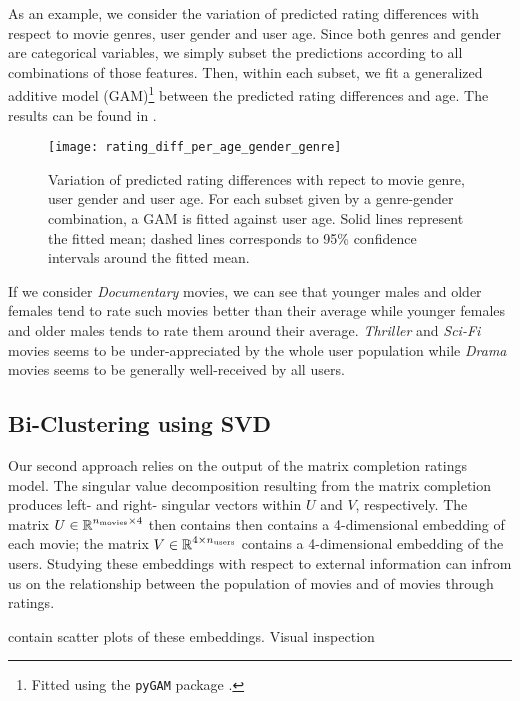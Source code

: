 \documentclass[bj, preprint]{imsart}
\begin{document}
As an example, we consider the variation of predicted rating differences with respect to movie genres, user gender and user age. Since both genres and gender are categorical variables, we simply subset the predictions according to all combinations of those features. Then, within each subset, we fit a generalized additive model (GAM)\footnote{Fitted using the \texttt{pyGAM} package \citep{pygam}.} between the predicted rating differences and age. The results can be found in .

\begin{figure}
	\texttt{[image: rating\_diff\_per\_age\_gender\_genre]}
	\caption{Variation of predicted rating differences with repect to movie genre, user gender and user age. For each subset given by a genre-gender combination, a GAM is fitted against user age. Solid lines represent the fitted mean; dashed lines corresponds to 95\% confidence intervals around the fitted mean.\label{fig:explore.corr.gam}}
\end{figure}

If we consider \textit{Documentary} movies, we can see that younger males and older females tend to rate such movies better than their average while younger females and older males tends to rate them around their average. \textit{Thriller} and \textit{Sci-Fi} movies seems to be under-appreciated by the whole user population while \textit{Drama} movies seems to be generally well-received by all users.

\subsection{Bi-Clustering using SVD}\label{subsec:explore.cluster}

Our second approach relies on the output of the matrix completion ratings model. The singular value decomposition resulting from the matrix completion produces left- and right- singular vectors within $U$ and $V$, respectively. The matrix $U\in\operatorname{\mathbb R}^{n_{\text{movies}}\times 4}$ then contains then contains a 4-dimensional embedding of each movie; the matrix $V\in\operatorname{\mathbb R}^{4\times n_{\text{users}}}$ contains a 4-dimensional embedding of the users. Studying these embeddings with respect to external information can infrom us on the relationship between the population of movies and of movies through ratings.

 contain scatter plots of these embeddings. Visual inspection 
\end{document}
